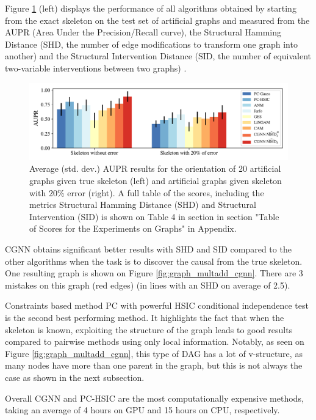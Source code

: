\documentclass[a4paper, 11pt]{article}
\begin{document}
Figure \ref{fig:score_graph} (left) displays the performance of all algorithms obtained by starting from the exact skeleton on the test set of artificial graphs and  measured from the AUPR (Area Under the Precision/Recall curve), the Structural Hamming Distance (SHD, the number of edge modifications to transform one graph into another)
and the Structural Intervention Distance (SID, the number of equivalent two-variable interventions between two graphs)
\cite{peters2013structural}.


\begin{figure}[h!]
\centering
\includegraphics[width=\textwidth]{graph_scores_multadd.pdf}
\caption{Average (std. dev.) AUPR results for the orientation of 20 artificial graphs given true skeleton (left) and artificial graphs given skeleton with 20\% error (right). A full table of the scores, including the metrics Structural Hamming Distance (SHD) and Structural Intervention (SID) \citep{peters2013structural} is shown on Table 4 in section in section "Table of Scores for the Experiments on Graphs" in Appendix. }
\label{fig:score_graph}
\end{figure}


CGNN obtains significant better results with SHD and SID  compared to the other algorithms when the task is to discover the causal from the true skeleton. One resulting graph is shown on Figure \ref{fig:graph_multadd_cgnn}. There are 3 mistakes on this graph (red edges) (in lines with an SHD on average of 2.5).

Constraints based method PC with powerful HSIC conditional independence test is the second best performing method. It highlights the fact that when the skeleton is known, exploiting the structure of the graph leads to good results compared to pairwise methods using only local information. Notably, as seen on Figure \ref{fig:graph_multadd_cgnn}, this type of DAG has a lot of v-structure, as many nodes have more than one parent in the graph, but this is not always the case as shown in the next subsection.

Overall CGNN and PC-HSIC are the most computationally expensive methods, taking an average of 4 hours on GPU and 15 hours on CPU, respectively.
\end{document}
